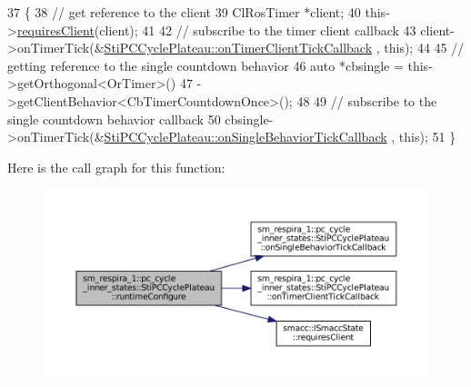 \begin{DoxyCode}
37   \{
38     \textcolor{comment}{// get reference to the client}
39     ClRosTimer *client;
40     this->\hyperlink{classsmacc_1_1ISmaccState_a7f95c9f0a6ea2d6f18d1aec0519de4ac}{requiresClient}(client);
41 
42     \textcolor{comment}{// subscribe to the timer client callback}
43     client->onTimerTick(&\hyperlink{structsm__respira__1_1_1pc__cycle__inner__states_1_1StiPCCyclePlateau_ac06330f07324f60ea5870ac89c75f7c5}{StiPCCyclePlateau::onTimerClientTickCallback}
      , \textcolor{keyword}{this});
44 
45     \textcolor{comment}{// getting reference to the single countdown behavior}
46     \textcolor{keyword}{auto} *cbsingle = this->getOrthogonal<OrTimer>()
47                           ->getClientBehavior<CbTimerCountdownOnce>();
48 
49     \textcolor{comment}{// subscribe to the single countdown behavior callback}
50     cbsingle->onTimerTick(&\hyperlink{structsm__respira__1_1_1pc__cycle__inner__states_1_1StiPCCyclePlateau_ac60bee4ecb4dd1983446b091075ce0b3}{StiPCCyclePlateau::onSingleBehaviorTickCallback}
      , \textcolor{keyword}{this});
51   \}
\end{DoxyCode}
Here is the call graph for this function\+:
\nopagebreak
\begin{figure}[H]
\begin{center}
\leavevmode
\includegraphics[width=350pt]{structsm__respira__1_1_1pc__cycle__inner__states_1_1StiPCCyclePlateau_a3805f3ea12735bcb40af9c9db7e5ce05_cgraph}
\end{center}
\end{figure}
\mbox{\label{structsm__respira__1_1_1pc__cycle__inner__states_1_1StiPCCyclePlateau_a974b0fd58423dea9273e7068cbaa2d9a}} 
